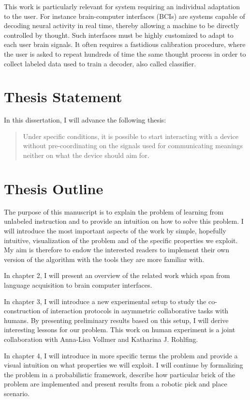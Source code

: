 This work is particularly relevant for system requiring an individual adaptation to the user. For instance brain-computer interfaces (BCIs) are systems capable of decoding neural activity in real time, thereby allowing a machine to be directly controlled by thought. Such interfaces must be highly customized to adapt to each user brain signals. It often requires a fastidious calibration procedure, where the user is asked to repeat hundreds of time the same thought process in order to collect labeled data used to train a decoder, also called classifier.

\section{Thesis Statement}

In this dissertation, I will advance the following thesis:

\begin{quote}
Under specific conditions, it is possible to start interacting with a device without pre-coordinating on the signals used for communicating meanings neither on what the device should aim for.
\end{quote}

\section{Thesis Outline}

The purpose of this manuscript is to explain the problem of learning from unlabeled instruction and to provide an intuition on how to solve this problem. I will introduce the most important aspects of the work by simple, hopefully intuitive, visualization of the problem and of the specific properties we exploit. My aim is therefore to endow the interested readers to implement their own version of the algorithm with the tools they are more familiar with.

In chapter 2, I will present an overview of the related work which span from language acquisition to brain computer interfaces. 

In chapter 3, I will introduce a new experimental setup to study the co-construction of interaction protocols in asymmetric collaborative tasks with humans. By presenting preliminary results based on this setup, I will derive interesting lessons for our problem. This work on human experiment is a joint collaboration with Anna-Lisa Vollmer and Katharina J. Rohlfing. 

In chapter 4, I will introduce in more specific terms the problem and provide a visual intuition on what properties we will exploit. I will continue by formalizing the problem in a probabilistic framework, describe how particular brick of the problem are implemented and present results from a robotic pick and place scenario.

